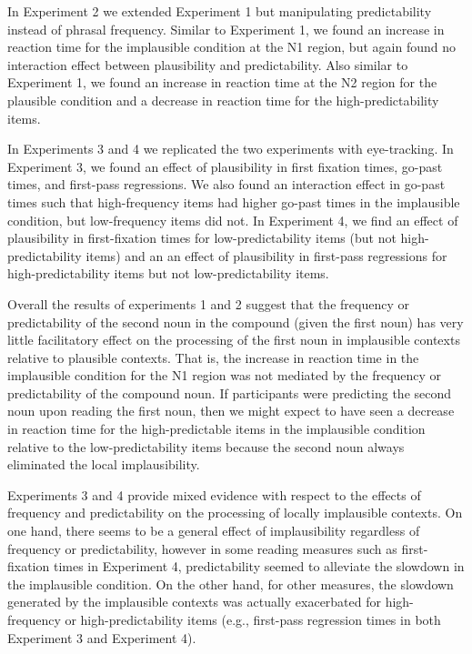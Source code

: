 \documentclass[
  12pt,
  letterpaper,
]{scrreport}
\begin{document}
In Experiment 2 we extended Experiment 1 but manipulating predictability
instead of phrasal frequency. Similar to Experiment 1, we found an
increase in reaction time for the implausible condition at the N1
region, but again found no interaction effect between plausibility and
predictability. Also similar to Experiment 1, we found an increase in
reaction time at the N2 region for the plausible condition and a
decrease in reaction time for the high-predictability items.

In Experiments 3 and 4 we replicated the two experiments with
eye-tracking. In Experiment 3, we found an effect of plausibility in
first fixation times, go-past times, and first-pass regressions. We also
found an interaction effect in go-past times such that high-frequency
items had higher go-past times in the implausible condition, but
low-frequency items did not. In Experiment 4, we find an effect of
plausibility in first-fixation times for low-predictability items (but
not high-predictability items) and an an effect of plausibility in
first-pass regressions for high-predictability items but not
low-predictability items.

Overall the results of experiments 1 and 2 suggest that the frequency or
predictability of the second noun in the compound (given the first noun)
has very little facilitatory effect on the processing of the first noun
in implausible contexts relative to plausible contexts. That is, the
increase in reaction time in the implausible condition for the N1 region
was not mediated by the frequency or predictability of the compound
noun. If participants were predicting the second noun upon reading the
first noun, then we might expect to have seen a decrease in reaction
time for the high-predictable items in the implausible condition
relative to the low-predictability items because the second noun always
eliminated the local implausibility.

Experiments 3 and 4 provide mixed evidence with respect to the effects
of frequency and predictability on the processing of locally implausible
contexts. On one hand, there seems to be a general effect of
implausibility regardless of frequency or predictability, however in
some reading measures such as first-fixation times in Experiment 4,
predictability seemed to alleviate the slowdown in the implausible
condition. On the other hand, for other measures, the slowdown generated
by the implausible contexts was actually exacerbated for high-frequency
or high-predictability items (e.g., first-pass regression times in both
Experiment 3 and Experiment 4).
\end{document}
